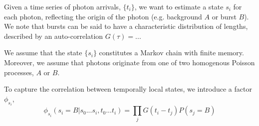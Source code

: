 \documentclass{article}
\begin{document}
Given a time series of photon arrivals, $\{ t_i \}$, we want to
estimate a state $s_i$ for each photon, reflecting the origin of the
photon (e.g. background $A$ or burst $B$). We note that bursts can be
said to have a characteristic distribution of lengths, described by an
auto-correlation $G(\tau) = ...$

We assume that the state $\{s_i\}$ constitutes a Markov chain with
finite memory. Moreover, we assume that photons originate from one of
two homogenous Poisson processes, $A$ or $B$. 

To capture the correlation between temporally local states, we introduce a factor $\phi_{s_i}$,
\[ \phi_{s_i}(s_i=B \vert s_0 ... s_i, t_0 ... t_i) = \prod_j G(t_i - t_j) P(s_j=B) \]
\end{document}
